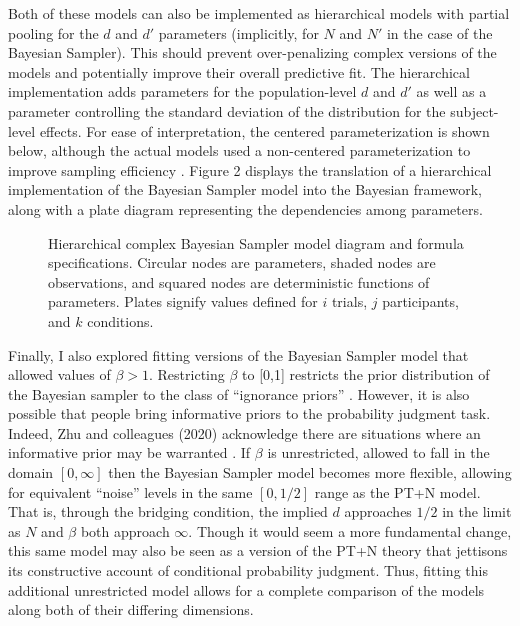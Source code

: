 \documentclass[
  english,
  man,floatsintext]{apa6}
\begin{document}
Both of these models can also be implemented as hierarchical models with partial pooling for the \(d\) and \(d'\) parameters (implicitly, for \(N\) and \(N'\) in the case of the Bayesian Sampler). This should prevent over-penalizing complex versions of the models and potentially improve their overall predictive fit. The hierarchical implementation adds parameters for the population-level \(d\) and \(d'\) as well as a parameter controlling the standard deviation of the distribution for the subject-level effects. For ease of interpretation, the centered parameterization is shown below, although the actual models used a non-centered parameterization to improve sampling efficiency \autocite{papaspiliopoulos.etal2007}. Figure 2 displays the translation of a hierarchical implementation of the Bayesian Sampler model into the Bayesian framework, along with a plate diagram representing the dependencies among parameters.

\begin{figure}
  \begin{minipage}{.5\textwidth}
    \flushright
    
  \end{minipage}%
  \begin{minipage}{.5\textwidth}
    \flushleft
    \small
    
  \end{minipage}
  \caption{Hierarchical complex Bayesian Sampler model diagram and formula specifications. Circular nodes are parameters, shaded nodes are observations, and squared nodes are deterministic functions of parameters. Plates signify values defined for $i$ trials, $j$ participants, and $k$ conditions.}
\end{figure}

Finally, I also explored fitting versions of the Bayesian Sampler model that allowed values of \(\beta > 1\). Restricting \(\beta\) to {[}0,1{]} restricts the prior distribution of the Bayesian sampler to the class of ``ignorance priors'' \autocite{zhu.etal2020}. However, it is also possible that people bring informative priors to the probability judgment task. Indeed, Zhu and colleagues (2020) acknowledge there are situations where an informative prior may be warranted \autocite[see e.g.,][]{fennell.baddeley2012}. If \(\beta\) is unrestricted, allowed to fall in the domain \([0, \infty]\) then the Bayesian Sampler model becomes more flexible, allowing for equivalent ``noise'' levels in the same \([0, 1/2]\) range as the PT+N model. That is, through the bridging condition, the implied \(d\) approaches \(1/2\) in the limit as \(N\) and \(\beta\) both approach \(\infty\). Though it would seem a more fundamental change, this same model may also be seen as a version of the PT+N theory that jettisons its constructive account of conditional probability judgment. Thus, fitting this additional unrestricted model allows for a complete comparison of the models along both of their differing dimensions.
\end{document}

